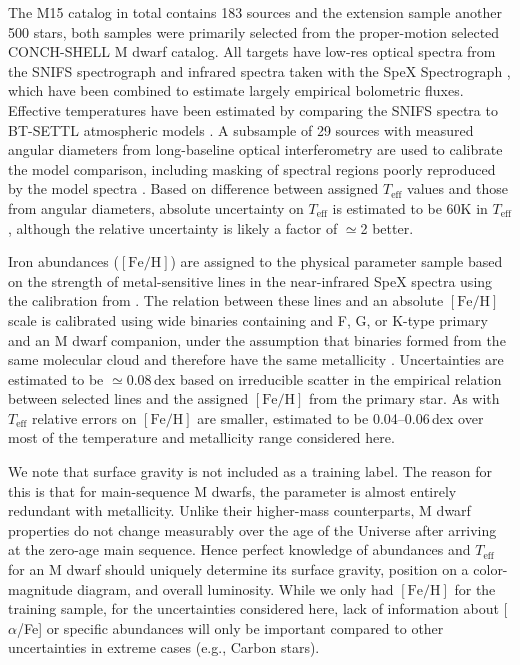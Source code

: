 \documentclass[modern]{aastex62}
\newcommand{\teff}{T_{\mathrm{eff}}}
\newcommand{\feh}{[{\mathrm{Fe}/\mathrm{H}}]}
\begin{document}
The M15 catalog in total contains 183 sources and the extension sample another 500 stars, both samples were primarily selected from the proper-motion selected CONCH-SHELL \citep{Gaidos:2013} M dwarf catalog. All targets have low-res optical spectra from the SNIFS spectrograph \citep{Lantz:2004} and infrared spectra taken with the SpeX Spectrograph \citep{Rayner:2003}, which have been combined to estimate largely empirical bolometric fluxes. Effective temperatures have been estimated by comparing the SNIFS spectra to BT-SETTL atmospheric models \citep{Allard:2011}. A subsample of 29 sources with measured angular diameters from long-baseline optical interferometry \citep{Boyajian:2012} are used to calibrate the model comparison, including masking of spectral regions poorly reproduced by the model spectra \citep{Mann:2013c}. Based on difference between assigned $\teff$ values and those from angular diameters, absolute uncertainty on $\teff$ is estimated to be 60K in $\teff$, although the relative uncertainty is likely a factor of $\simeq$2 better.

Iron abundances ($\feh$) are assigned to the physical parameter sample based on the strength of metal-sensitive lines in the near-infrared SpeX spectra \citep{RojasAyala:2010} using the calibration from \citet{Mann:2013a}. The relation between these lines and an absolute $\feh$ scale is calibrated using wide binaries containing and F, G, or K-type primary and an M dwarf companion, under the assumption that binaries formed from the same molecular cloud and therefore have the same metallicity \citep{Bonfils:2005}. Uncertainties are estimated to be $\simeq$0.08\,dex based on irreducible scatter in the empirical relation between selected lines and the assigned $\feh$ from the primary star. As with $\teff$ relative errors on $\feh$ are smaller, estimated to be 0.04--0.06\,dex over most of the temperature and metallicity range considered here.

We note that surface gravity is not included as a training label. The reason for this is that for main-sequence M dwarfs, the parameter is almost entirely redundant with metallicity. Unlike their higher-mass counterparts, M dwarf properties do not change measurably over the age of the Universe after arriving at the zero-age main sequence. Hence perfect knowledge of abundances and $\teff$ for an M dwarf should uniquely determine its surface gravity, position on a color-magnitude diagram, and overall luminosity. While we only had $\feh$ for the training sample, for the uncertainties considered here, lack of information about [$\alpha$/Fe] or specific abundances will only be important compared to other uncertainties in extreme cases (e.g., Carbon stars). 
\end{document}
